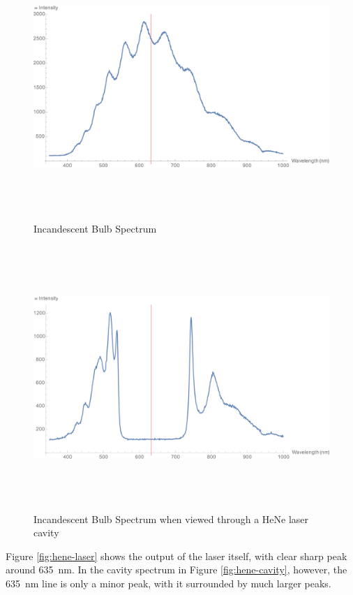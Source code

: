\documentclass[a4paper]{scrartcl}
\begin{document}
\begin{figure}
    \centering
    \includegraphics[height = 10cm]{Q2/Incandescent.png}
    \caption{Incandescent Bulb Spectrum}
    \label{fig:incandescent}
\end{figure}
\begin{figure}
    \centering
    \includegraphics[height = 10cm]{Q2/Incandescent + Cavity.png}
    \caption{Incandescent Bulb Spectrum when viewed through a HeNe laser cavity}
    \label{fig:incandescent-cavity}
\end{figure}

Figure \ref{fig:hene-laser} shows the output of the laser itself, with clear sharp peak around \SI{635}{\nano\metre}. In the cavity spectrum in Figure \ref{fig:hene-cavity}, however, the \SI{635}{\nano\metre} line is only a minor peak, with it surrounded by much larger peaks.
\end{document}

